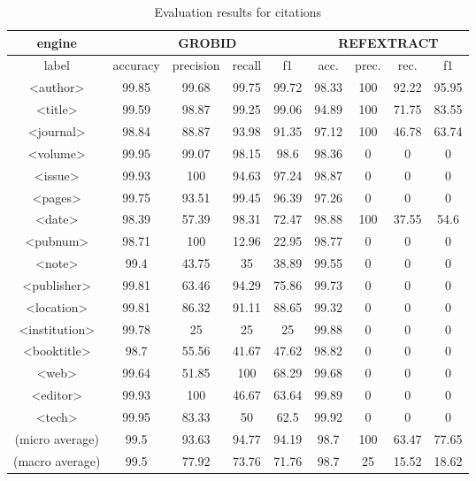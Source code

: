 \begin{table}[h]
\begin{center}
\begin{tabular}{|c|cccc|cccc|}
\hline
engine &  \multicolumn{4}{c}{GROBID} & \multicolumn{4}{c}{REFEXTRACT}\\
\hline
label & accuracy & precision & recall & f1 & acc. & prec. & rec. & f1\\
\hline
<author>	&	99.85	&	99.68	&	99.75	&	99.72 	& 98.33	&	100	&	92.22	&	95.95	\\
<title>	&	99.59	&	98.87	&	99.25	&	99.06 	& 94.89	&	100	&	71.75	&	83.55	\\
<journal>	&	98.84	&	88.87	&	93.98	&	91.35 	& 97.12	&	100	&	46.78	&	63.74	\\
<volume>&	99.95	&	99.07	&	98.15	&	98.6 		& 98.36	&	0	&	0		&	0	\\
<issue>	&	99.93	&	100		&	94.63	&	97.24	 & 98.87	&	0	&	0		&	0	\\
<pages>	&	99.75	&	93.51	&	99.45	&	96.39 	& 97.26	&	0	&	0		&	0	\\
<date>	&	98.39	&	57.39	&	98.31	&	72.47 	& 98.88	&	100	&	37.55	&	54.6	\\
<pubnum>&	98.71	&	100		&	12.96	&	22.95 	& 98.77	&	0	&	0		&	0	\\
<note>	&	99.4	 	&	43.75	&	35		&	38.89 	& 99.55	&	0	&	0		&	0	\\
<publisher>&	99.81	&	63.46	&	94.29	&	75.86 	& 99.73	&	0	&	0		&	0	\\
<location>&	99.81	&	86.32	&	91.11	&	88.65 	& 99.32	&	0	&	0		&	0	\\
<institution>&	99.78	&	25		&	25		&	25 		& 99.88	&	0	&	0		&	0	\\
<booktitle>&	98.7		&	55.56	&	41.67	&	47.62 	& 98.82	&	0	&	0		&	0	\\
<web>	&	99.64	&	51.85	&	100		&	68.29 	& 99.68	&	0	&	0		&	0	\\
<editor>	&	99.93	&	100		&46.67		&	63.64 	& 99.89	&	0	&	0		&	0	\\
<tech>	&	99.95	&	83.33	&	50		&	62.5 		& 99.92	&	0	&	0		&	0	\\
\hline
(micro average) & 99.5	&	93.63	&	94.77 	&	94.19 & 98.7	&	100	&	63.47 	&	77.65	\\
(macro average) & 99.5	&	77.92	&	73.76	&	71.76 & 98.7	&	25	&	15.52	&	18.62	\\
\hline
\end{tabular}
\caption[Table caption text]{Evaluation results for citations}
\end{center}
\end{table}
